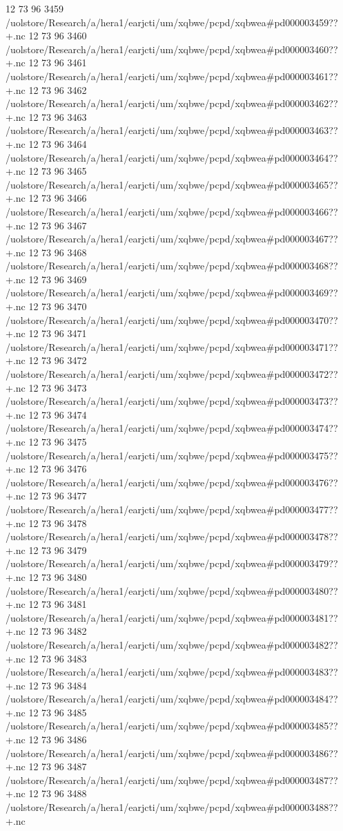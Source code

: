 12 73 96
3459
/uolstore/Research/a/hera1/earjcti/um/xqbwe/pcpd/xqbwea#pd000003459??+.nc
12 73 96
3460
/uolstore/Research/a/hera1/earjcti/um/xqbwe/pcpd/xqbwea#pd000003460??+.nc
12 73 96
3461
/uolstore/Research/a/hera1/earjcti/um/xqbwe/pcpd/xqbwea#pd000003461??+.nc
12 73 96
3462
/uolstore/Research/a/hera1/earjcti/um/xqbwe/pcpd/xqbwea#pd000003462??+.nc
12 73 96
3463
/uolstore/Research/a/hera1/earjcti/um/xqbwe/pcpd/xqbwea#pd000003463??+.nc
12 73 96
3464
/uolstore/Research/a/hera1/earjcti/um/xqbwe/pcpd/xqbwea#pd000003464??+.nc
12 73 96
3465
/uolstore/Research/a/hera1/earjcti/um/xqbwe/pcpd/xqbwea#pd000003465??+.nc
12 73 96
3466
/uolstore/Research/a/hera1/earjcti/um/xqbwe/pcpd/xqbwea#pd000003466??+.nc
12 73 96
3467
/uolstore/Research/a/hera1/earjcti/um/xqbwe/pcpd/xqbwea#pd000003467??+.nc
12 73 96
3468
/uolstore/Research/a/hera1/earjcti/um/xqbwe/pcpd/xqbwea#pd000003468??+.nc
12 73 96
3469
/uolstore/Research/a/hera1/earjcti/um/xqbwe/pcpd/xqbwea#pd000003469??+.nc
12 73 96
3470
/uolstore/Research/a/hera1/earjcti/um/xqbwe/pcpd/xqbwea#pd000003470??+.nc
12 73 96
3471
/uolstore/Research/a/hera1/earjcti/um/xqbwe/pcpd/xqbwea#pd000003471??+.nc
12 73 96
3472
/uolstore/Research/a/hera1/earjcti/um/xqbwe/pcpd/xqbwea#pd000003472??+.nc
12 73 96
3473
/uolstore/Research/a/hera1/earjcti/um/xqbwe/pcpd/xqbwea#pd000003473??+.nc
12 73 96
3474
/uolstore/Research/a/hera1/earjcti/um/xqbwe/pcpd/xqbwea#pd000003474??+.nc
12 73 96
3475
/uolstore/Research/a/hera1/earjcti/um/xqbwe/pcpd/xqbwea#pd000003475??+.nc
12 73 96
3476
/uolstore/Research/a/hera1/earjcti/um/xqbwe/pcpd/xqbwea#pd000003476??+.nc
12 73 96
3477
/uolstore/Research/a/hera1/earjcti/um/xqbwe/pcpd/xqbwea#pd000003477??+.nc
12 73 96
3478
/uolstore/Research/a/hera1/earjcti/um/xqbwe/pcpd/xqbwea#pd000003478??+.nc
12 73 96
3479
/uolstore/Research/a/hera1/earjcti/um/xqbwe/pcpd/xqbwea#pd000003479??+.nc
12 73 96
3480
/uolstore/Research/a/hera1/earjcti/um/xqbwe/pcpd/xqbwea#pd000003480??+.nc
12 73 96
3481
/uolstore/Research/a/hera1/earjcti/um/xqbwe/pcpd/xqbwea#pd000003481??+.nc
12 73 96
3482
/uolstore/Research/a/hera1/earjcti/um/xqbwe/pcpd/xqbwea#pd000003482??+.nc
12 73 96
3483
/uolstore/Research/a/hera1/earjcti/um/xqbwe/pcpd/xqbwea#pd000003483??+.nc
12 73 96
3484
/uolstore/Research/a/hera1/earjcti/um/xqbwe/pcpd/xqbwea#pd000003484??+.nc
12 73 96
3485
/uolstore/Research/a/hera1/earjcti/um/xqbwe/pcpd/xqbwea#pd000003485??+.nc
12 73 96
3486
/uolstore/Research/a/hera1/earjcti/um/xqbwe/pcpd/xqbwea#pd000003486??+.nc
12 73 96
3487
/uolstore/Research/a/hera1/earjcti/um/xqbwe/pcpd/xqbwea#pd000003487??+.nc
12 73 96
3488
/uolstore/Research/a/hera1/earjcti/um/xqbwe/pcpd/xqbwea#pd000003488??+.nc
